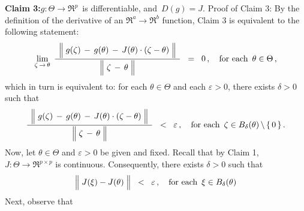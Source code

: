 \vskip 0.5cm
\noindent
\textbf{Claim 3:}\quad $g : \Theta \longrightarrow \Re^{p}$\, is differentiable, and \,$D(g) = J$.
\vskip 0.1cm
\noindent
Proof of Claim 3:\quad
By the definition of the derivative of an $\Re^{a} \longrightarrow \Re^{b}$ function,
Claim 3 is equivalent to the following statement:
\begin{equation*}
\underset{\zeta\,\rightarrow\,\theta}{\lim}\;\,
\dfrac{
	{\color{white}.}
	\left\Vert\;
		g(\zeta) \, \overset{{\color{white}.}}{-} \, g(\theta) \, - \, J(\theta)\cdot(\zeta - \theta)
		\;\right\Vert
	{\color{white}.}
	}{
	\left\Vert\;
		\zeta \, \overset{{\color{white}.}}{-} \, \theta
		\;\right\Vert
	}
\;\; = \;\;
	0\,,
\quad
\textnormal{for each \,$\theta \in \Theta$}\,,
\end{equation*}
which in turn is equivalent to:
for each $\theta \in \Theta$ and each $\varepsilon > 0$,
there exists $\delta > 0$ such that
\begin{equation*}
\dfrac{
	{\color{white}.}
	\left\Vert\;
		g(\zeta) \, \overset{{\color{white}.}}{-} \, g(\theta) \, - \, J(\theta)\cdot(\zeta - \theta)
		\;\right\Vert
	{\color{white}.}
	}{
	\left\Vert\;
		\zeta \, \overset{{\color{white}.}}{-} \, \theta
		\;\right\Vert
	}
\;\; < \;\;
	\varepsilon\,,
\quad
\textnormal{for each \,$\zeta \in B_{\delta}(\theta)\,\backslash\,\{\,0\,\}$}\,.
\end{equation*}
Now, let $\theta \in \Theta$ and $\varepsilon > 0$ be given and fixed.
Recall that by Claim 1, $J : \Theta \longrightarrow \Re^{p \times p}$ is continuous.
Consequently, there exists $\delta > 0$ such that
\begin{equation*}
\left\Vert\; J(\xi) \overset{{\color{white}.}}{-} J(\theta) \;\right\Vert
\;\; < \;\;
	\varepsilon\,,
\quad
\textnormal{for each \,$\xi \in B_{\delta}(\theta)$}
\end{equation*}
Next, observe that
